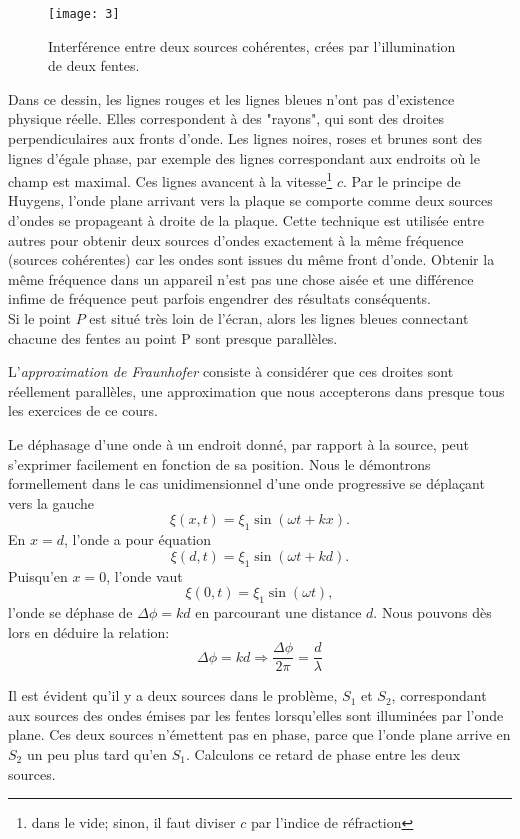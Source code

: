 \begin{figure}[htb]
\centering
\texttt{[image: 3]}
\caption{Interférence entre deux sources cohérentes, crées par l'illumination de deux fentes.}
\label{3}
\end{figure}

Dans ce dessin, les lignes rouges et les lignes bleues n'ont pas d'existence physique réelle. Elles correspondent à des "rayons", qui sont des droites perpendiculaires aux fronts d'onde. Les lignes noires, roses et brunes sont des lignes d'égale phase, par exemple des lignes correspondant aux endroits où le champ est maximal. Ces lignes avancent à la vitesse\footnote{dans le vide; sinon, il faut diviser $c$ par l'indice de réfraction} $c$. Par le principe de Huygens, l'onde plane arrivant vers la plaque se comporte comme deux sources d'ondes se propageant à droite de la plaque. Cette technique est utilisée entre autres pour obtenir deux sources d'ondes exactement à la même fréquence (sources cohérentes) car les ondes sont issues du même front d'onde. Obtenir la même fréquence dans un appareil n'est pas une chose aisée et une différence infime de fréquence peut parfois engendrer des résultats conséquents.\\

Si le point $P$ est situé très loin de l'écran, alors les lignes bleues connectant chacune des fentes au point P sont presque parallèles. 

L'\textit{approximation de Fraunhofer} consiste à considérer que ces droites sont réellement parallèles, une approximation que nous accepterons dans presque tous les exercices de ce cours.

Le déphasage d'une onde à un endroit donné, par rapport à la source, peut s'exprimer facilement en fonction de sa position. Nous le démontrons formellement dans le cas unidimensionnel d'une onde progressive se déplaçant vers la gauche
$$\xi(x,t)=\xi_1\sin(\omega t+kx).$$
En $x=d$, l'onde a pour équation 
$$ \xi(d,t)=\xi_1\sin(\omega t+kd).$$ 
Puisqu'en $x=0$, l'onde vaut 
$$ \xi(0,t)=\xi_1\sin(\omega t),$$ 
l'onde se déphase de $\Delta \phi=kd$ en parcourant une distance $d$. Nous pouvons dès lors en déduire la relation:
$$\Delta\phi=kd\Rightarrow\frac{\Delta\phi}{2\pi}=\frac{d}{\lambda}$$ 


Il est évident qu'il y a deux sources dans le problème, $S_1$ et $S_2$, correspondant aux sources des ondes émises par les fentes lorsqu'elles sont illuminées par l'onde plane. Ces deux sources n'émettent pas en phase, parce que l'onde plane arrive en $S_2$ un peu plus tard qu'en $S_1$. 
Calculons ce retard de phase entre les deux sources.\\

